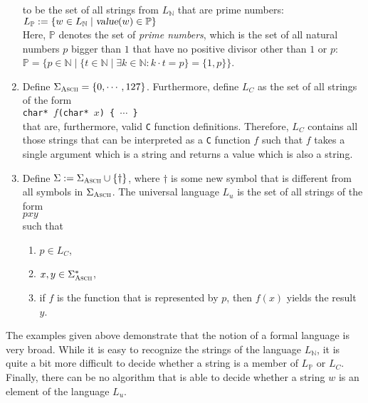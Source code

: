 \begin{enumerate}
      to be the set of all strings from $L_\mathbb{N}$ that are prime numbers:
      \\[0.2cm]
      \hspace*{1.3cm}
      $L_\mathbb{P} := \{ w \in L_\mathbb{N} \mid \textsl{value}(w) \in \mathbb{P} \}$
      \\[0.2cm]
      Here, $\mathbb{P}$ denotes the set of \emph{prime numbers}, which is the set of all natural
      numbers $p$ bigger than $1$ that have no positive divisor other than $1$ or $p$:
      \\[0.2cm]
      \hspace*{1.3cm}
      $\mathbb{P} = \bigl\{ p \in \mathbb{N} \;\big|\; \{ t \in \mathbb{N} \mid \exists k \in
      \mathbb{N} : k \cdot t = p \} = \{1, p\} \bigr\}$.
\item Define $\Sigma_{\textsc{\scriptsize Ascii}} = \{ 0, \cdots, 127\}$.  Furthermore, define $L_C$
      as the set of all strings of the form
      \\[0.2cm]
      \hspace*{1.3cm}
      \texttt{char* $f$(char* $x$) \{ $\cdots$ \}}
      \\[0.2cm]
      that are, furthermore, valid \texttt{C} function definitions.
      Therefore,  $L_C$ contains all those strings that can be interpreted as a \texttt{C} function $f$
      such that $f$ takes a single argument which is a string and returns a value which is also a
      string.
\item Define $\Sigma := \Sigma_{\textsc{\scriptsize Ascii}} \cup \{\dag\}$, where
      $\mathtt{\dag}$ is some new symbol that is different from all symbols in
      $\Sigma_{\textsc{\scriptsize Ascii}}$.
      The universal language $L_u$ is the set of all strings of the form
      \\[0.2cm]
      \hspace*{1.3cm}
      $p$\dag$x$\dag$y$
      \\[0.2cm]
      such that
      \begin{enumerate}
      \item $p \in L_C$,
      \item $x,y \in \Sigma_{\textsc{Ascii}}^*$,
      \item if $f$ is the function that is represented by $p$, then $f(x)$ yields the result $y$.
            \eox
      \end{enumerate}
\end{enumerate}
The examples given above demonstrate that the notion of a formal language is very broad.
While it is easy to recognize the strings of the language $L_\mathbb{N}$, it is quite a bit more
difficult to decide whether a string is a member of 
$L_\mathbb{P}$ or $L_C$.  Finally, there can be no algorithm that is able to decide whether a string
$w$ is an element of the language $L_u$. 

